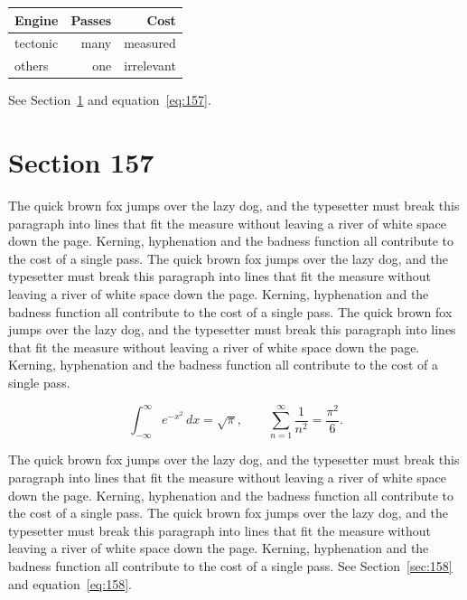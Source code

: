 \documentclass{article}
\begin{document}
\begin{center}
\begin{tabular}{lrr}
\toprule
Engine & Passes & Cost \\
\midrule
tectonic & many & measured \\
others & one & irrelevant \\
\bottomrule
\end{tabular}
\end{center}

See Section~\ref{sec:157} and equation~\eqref{eq:157}.
\section{Section 157}
\label{sec:157}
The quick brown fox jumps over the lazy dog, and the typesetter must break this paragraph into lines that fit the measure without leaving a river of white space down the page. Kerning, hyphenation and the badness function all contribute to the cost of a single pass. The quick brown fox jumps over the lazy dog, and the typesetter must break this paragraph into lines that fit the measure without leaving a river of white space down the page. Kerning, hyphenation and the badness function all contribute to the cost of a single pass. The quick brown fox jumps over the lazy dog, and the typesetter must break this paragraph into lines that fit the measure without leaving a river of white space down the page. Kerning, hyphenation and the badness function all contribute to the cost of a single pass. 

\begin{equation}\label{eq:157}
\int_{-\infty}^{\infty} e^{-x^{2}}\,dx = \sqrt{\pi}, \qquad
\sum_{n=1}^{\infty} \frac{1}{n^{2}} = \frac{\pi^{2}}{6}.
\end{equation}

The quick brown fox jumps over the lazy dog, and the typesetter must break this paragraph into lines that fit the measure without leaving a river of white space down the page. Kerning, hyphenation and the badness function all contribute to the cost of a single pass. The quick brown fox jumps over the lazy dog, and the typesetter must break this paragraph into lines that fit the measure without leaving a river of white space down the page. Kerning, hyphenation and the badness function all contribute to the cost of a single pass. 
See Section~\ref{sec:158} and equation~\eqref{eq:158}.
\end{document}
